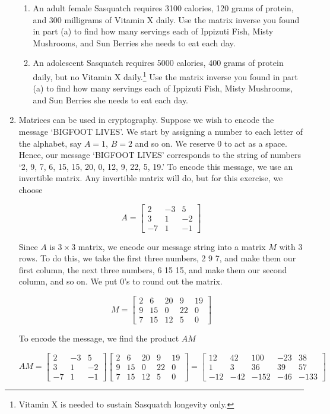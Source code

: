 \begin{enumerate}
\begin{enumerate}
\item  An adult female Sasquatch requires 3100 calories, 120 grams of protein, and 300 milligrams of Vitamin X daily. Use the matrix inverse you found in part (a) to find how many servings each of Ippizuti Fish, Misty Mushrooms, and Sun Berries she needs to eat each day.

\item  An adolescent Sasquatch requires 5000 calories, 400 grams of protein daily, but no Vitamin X daily.\footnote{Vitamin X is needed to sustain Sasquatch longevity only.}   Use the matrix inverse you found in part (a) to find how many servings each of Ippizuti Fish, Misty Mushrooms, and Sun Berries she needs to eat each day.

\end{enumerate}


\item Matrices can be used in cryptography.  Suppose we wish to encode the message `BIGFOOT LIVES'.  We start by assigning a number to each letter of the alphabet, say $A=1$, $B=2$ and so on.  We reserve $0$ to act as a space.  Hence, our message `BIGFOOT LIVES' corresponds to the string of numbers `2, 9, 7, 6, 15, 15, 20, 0, 12, 9, 22, 5, 19.' To encode this message, we use an invertible matrix.  Any invertible matrix will do, but for this exercise, we choose

\[ A = \left[ \begin{array}{rrr} 2 & -3 & 5 \\ 3 & 1 &-2 \\ -7 & 1 & -1 \end{array} \right] \]

Since $A$ is  $3 \times 3$ matrix, we encode our message string into a matrix $M$ with $3$ rows.  To do this, we take the first three numbers, 2 9 7, and make them our first column, the next three numbers, 6 15 15, and make them our second column, and so on.  We put $0$'s to round out the matrix.


\[ M = \left[  \begin{array}{rrrrr} 2 & 6 & 20 & 9 & 19 \\ 9 & 15 & 0 & 22 & 0 \\ 7 & 15 & 12 & 5 & 0 \end{array} \right] \]

To encode the message, we find the product $AM$

\[AM =  \left[ \begin{array}{rrr} 2 & -3 & 5 \\ 3 & 1 &-2 \\ -7 & 1 & -1 \end{array} \right]\left[  \begin{array}{rrrrr} 2 & 6 & 20 & 9 & 19 \\ 9 & 15 & 0 & 22 & 0 \\ 7 & 15 & 12 & 5 & 0 \end{array} \right] = \left[  \begin{array}{rrrrr} 12 & 42 & 100 & -23 & 38 \\ 1 & 3 & 36 & 39 & 57 \\ -12 & -42 & -152 & -46 & -133 \end{array} \right]\]


\end{enumerate}
